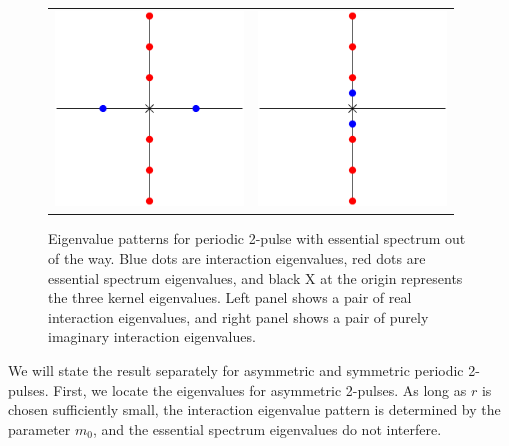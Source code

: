 \documentclass[thesis.tex]{subfiles}
\begin{document}
\begin{figure}
\begin{center}
\begin{tabular}{cc}
\includegraphics[width=5cm]{images/kdv5/2punstableeigpattern.eps} &
\includegraphics[width=5cm]{images/kdv5/2pstableeigpattern.eps} 
\end{tabular}
\caption{Eigenvalue patterns for periodic 2-pulse with essential spectrum out of the way. Blue dots are interaction eigenvalues, red dots are essential spectrum eigenvalues, and black X at the origin represents the three kernel eigenvalues. Left panel shows a pair of real interaction eigenvalues, and right panel shows a pair of purely imaginary interaction eigenvalues. }
\label{fig:2ppatterns}
\end{center}
\end{figure}

We will state the result separately for asymmetric and symmetric periodic 2-pulses. First, we locate the eigenvalues for asymmetric 2-pulses. As long as $r$ is chosen sufficiently small, the interaction eigenvalue pattern is determined by the parameter $m_0$, and the essential spectrum eigenvalues do not interfere.
\end{document}

